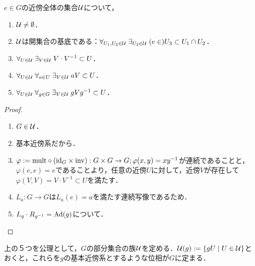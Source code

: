 \documentclass[uplatex,dvipdfmx]{jsreport}
\begin{document}
\begin{lemma}[使える連続写像のレパートリー]\label{lemma-morphism-toolset-for-topological-group}
    $e\in G$の近傍全体の集合$\mathcal{U}$について，
    \begin{enumerate}
        \item $\mathcal{U}\ne\emptyset$．
        \item $\mathcal{U}$は開集合の基底である：$\forall_{U_1,U_2\in\mathcal{U}}\;\exists_{U_3\in\mathcal{U}}\;(e\in)U_3\subset U_1\cap U_2$．
        \item $\forall_{U\in\mathcal{U}}\;\exists_{V\in\mathcal{U}}\;V\cdot V^{-1}\subset U$．
        \item $\forall_{U\in\mathcal{U}}\;\forall_{a\in U}\;\exists_{V\in\mathcal{U}}\;aV\subset U$．
        \item $\forall_{U\in\mathcal{U}}\;\forall_{g\in G}\;\exists_{V\in\mathcal{U}}\;gVg^{-1}\subset U$．
    \end{enumerate}
\end{lemma}
\begin{proof}\mbox{}
    \begin{enumerate}
        \item $G\in\mathcal{U}$．
        \item 基本近傍系だから．
        \item $\varphi:=\mathrm{mult}\circ(\mathrm{id}_G\times\mathrm{inv}):G\times G\to G;\varphi(x,y)=xy^{-1}$が連続であることと，$\varphi(e,e)=e$であることより，任意の近傍$U$に対して，近傍$V$が存在して$\varphi(V,V)=V\cdot V^{-1}\subset U$を満たす．
        \item $L_a:G\to G$は$L_a(e)=a$を満たす連続写像であるため．
        \item $L_g\cdot R_{g^{-1}}=\mathrm{Ad}(g)$について．
    \end{enumerate}
\end{proof}
\begin{remark}
    上の５つを公理として，$G$の部分集合の族$\mathcal{U}$を定める．$\mathcal{U}(g):=\left\{gU\mid U\in\mathcal{U}\right\}$とおくと，これらを$g$の基本近傍系とするような位相が$G$に定まる．
\end{remark}
\end{document}
